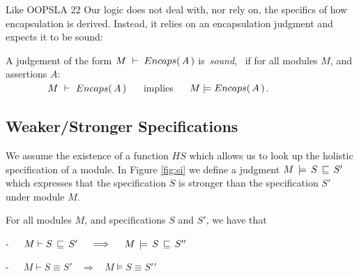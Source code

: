 Like OOPSLA 22 Our logic does not {deal with, nor} rely on, the specifics of  how   encapsulation
{is derived}.
{Instead, it relies} on an encapsulation judgment and expects it to be sound:

\begin{definition}
\label{lem:encap-soundness}
A judgement of the form $M\ \vdash\ {Encaps(\, A\, )}$  is\  \emph{sound}, \ if 
for all modules $M$, and assertions $A$:\\

$\strut \hspace{1.5cm} M\ \vdash\ {Encaps(\, A\, )} \ \ \ \ $ implies $\ \ \ \ \satisfies{M}{\encaps{A}}$.
\end{definition}



%








\subsection{Weaker/Stronger Specifications}

We assume   the existence of a function $HS$ which allows us to look up the holistic specification of a module. 
In Figure \ref{fig:si} we   define a judgment $M\, \models\, S\, \sqsubseteq\, S'$ which expresses that the specification $S$ is stronger than the specification $S'$ under module $M$.  


\begin{lemma}
For all modules $M$, and specifications $S$ and $S'$, we have that\\
\strut \hspace{2cm}-\ \ \  $\strongerI M  S  {S'}    \ \ \ \ \Longrightarrow\ \ \ \ \stronger M S {S'}'$\\
\strut \hspace{2cm}-\ \ \  $M \vdash S \equiv S'    \ \ \ \ \Longrightarrow\ \ \ \ M \models S \equiv {S'}'$
\end{lemma}

